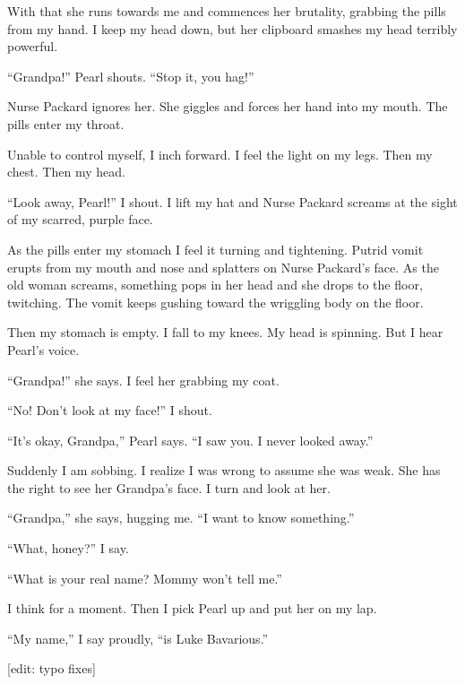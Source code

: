 With that she runs towards me and commences her brutality, grabbing
the pills from my hand. I keep my head down, but her clipboard
smashes my head terribly powerful.



``Grandpa!'' Pearl shouts. ``Stop it, you
hag!''



Nurse Packard ignores her. She giggles and forces her hand into my
mouth. The pills enter my throat.



Unable to control myself, I inch forward. I feel the light on my
legs. Then my chest. Then my head.



``Look away, Pearl!'' I shout. I lift my hat and Nurse
Packard screams at the sight of my scarred, purple face.



As the pills enter my stomach I feel it turning and tightening.
Putrid vomit erupts from my mouth and nose and splatters on Nurse
Packard's face. As the old woman screams, something pops in
her head and she drops to the floor, twitching. The vomit keeps
gushing toward the wriggling body on the floor.



Then my stomach is empty. I fall to my knees. My head is spinning.
But I hear Pearl's voice.



``Grandpa!'' she says. I feel her grabbing my coat.



``No! Don't look at my face!'' I shout.



``It's okay, Grandpa,'' Pearl says. ``I saw
you. I never looked away.''



Suddenly I am sobbing. I realize I was wrong to assume she was
weak. She has the right to see her Grandpa's face. I turn and
look at her.



``Grandpa,'' she says, hugging me. ``I want to know
something.''



``What, honey?'' I say.



``What is your real name? Mommy won't tell
me.''



I think for a moment. Then I pick Pearl up and put her on my
lap.



``My name,'' I say proudly, ``is Luke
Bavarious.''



[edit: typo fixes] 
 



